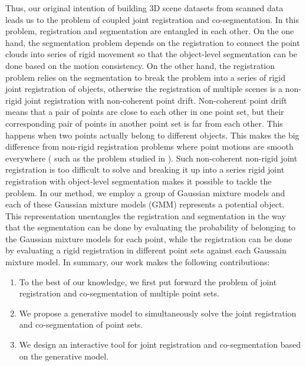 Thus, our original intention of building 3D scene datasets from scanned data leads us to the problem of coupled joint registration and co-segmentation.
In this problem, registration and segmentation are entangled in each other. On the one hand, the segmentation problem depends on the registration to connect the point clouds into series of rigid movement so that the object-level segmentation can be done based on the motion consistency. 
On the other hand, the registration problem relies on the segmentation to break the problem into a series of rigid joint registration of objects, otherwise the registration of multiple scenes is a non-rigid joint registration with non-coherent point drift.
%
Non-coherent point drift means that a pair of points are close to each other in one point set, but their corresponding pair of points in another point set is far from each other. 
This happens when two points actually belong to different objects.
%
This makes the big difference from non-rigid registration problems where point motions are smooth everywhere ( such as the problem studied in \cite{CPD} ).
%
Such non-coherent non-rigid joint registration is too difficult to solve and breaking it up into a series rigid joint registration with object-level segmentation makes it possible to tackle the problem. 
%
In our method, we employ a group of Gaussian mixture models and each of these Gaussian mixture models (GMM) represents a potential object. 
This representation unentangles the registration and segmentation in the way that the segmentation can be done by evaluating the probability of belonging to the Gaussian mixture models for each point, while the registration can be done by evaluating a rigid registration in different point sets against each Gaussain mixture model.
%
In summary, our work makes the following contributions: 
\begin{enumerate}
	\item To the best of our knowledge, we first put forward the problem of joint registration and co-segmentation of multiple point sets.
	
	\item We propose a generative model to simultaneously solve the joint registration and co-segmentation of point sets.
	
	\item We design an interactive tool for joint registration and co-segmentation based on the generative model. 
\end{enumerate}